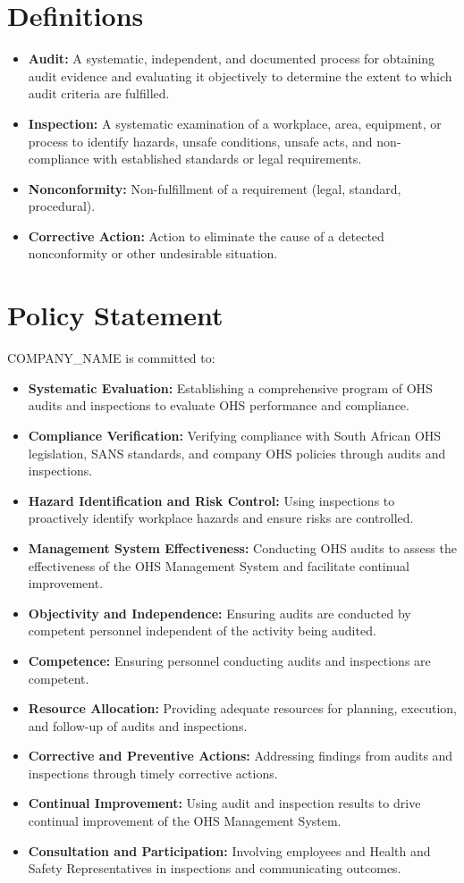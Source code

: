 \documentclass[12pt]{article}
\begin{document}
\section{Definitions}
\begin{itemize}
    \item \textbf{Audit:} A systematic, independent, and documented process for obtaining audit evidence and evaluating it objectively to determine the extent to which audit criteria are fulfilled.
    \item \textbf{Inspection:} A systematic examination of a workplace, area, equipment, or process to identify hazards, unsafe conditions, unsafe acts, and non-compliance with established standards or legal requirements.
    \item \textbf{Nonconformity:} Non-fulfillment of a requirement (legal, standard, procedural).
    \item \textbf{Corrective Action:} Action to eliminate the cause of a detected nonconformity or other undesirable situation.
\end{itemize}

\section{Policy Statement}
{{COMPANY_NAME}} is committed to:
\begin{itemize}
    \item \textbf{Systematic Evaluation:} Establishing a comprehensive program of OHS audits and inspections to evaluate OHS performance and compliance.
    \item \textbf{Compliance Verification:} Verifying compliance with South African OHS legislation, SANS standards, and company OHS policies through audits and inspections.
    \item \textbf{Hazard Identification and Risk Control:} Using inspections to proactively identify workplace hazards and ensure risks are controlled.
    \item \textbf{Management System Effectiveness:} Conducting OHS audits to assess the effectiveness of the OHS Management System and facilitate continual improvement.
    \item \textbf{Objectivity and Independence:} Ensuring audits are conducted by competent personnel independent of the activity being audited.
    \item \textbf{Competence:} Ensuring personnel conducting audits and inspections are competent.
    \item \textbf{Resource Allocation:} Providing adequate resources for planning, execution, and follow-up of audits and inspections.
    \item \textbf{Corrective and Preventive Actions:} Addressing findings from audits and inspections through timely corrective actions.
    \item \textbf{Continual Improvement:} Using audit and inspection results to drive continual improvement of the OHS Management System.
    \item \textbf{Consultation and Participation:} Involving employees and Health and Safety Representatives in inspections and communicating outcomes.
\end{itemize}
\end{document}
